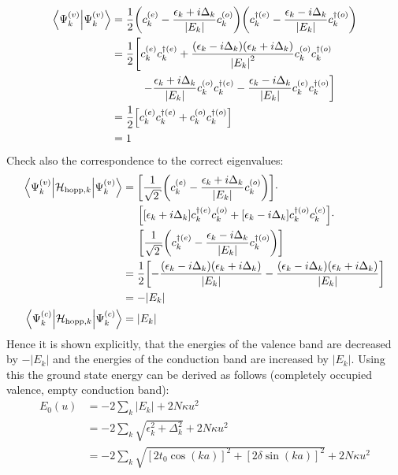 \begin{align}
\left\langle\Psi_k^{(v)}\Big|\Psi_k^{(v)}\right\rangle &= \frac{1}{2}
\left(c_k^{(e)}-\frac{\epsilon_k + i \Delta_k}{|E_k|}c_{k}^{(o)}\right)
\left(c_k^{\dagger(e)}-\frac{\epsilon_k - i \Delta_k}{|E_k|}c_{k}^{\dagger(o)}\right)\\
&= \frac{1}{2} \left[c_k^{(e)}c_k^{\dagger(e)}+\frac{\left(\epsilon_k-i\Delta_k\right)\left(\epsilon_k+i\Delta_k\right)}{\left|E_k\right|^2}c_k^{(o)}c_k^{\dagger(o)}\right.\nonumber\\
&\hspace*{1cm}\left.-\frac{\epsilon_k+i\Delta_k}{|E_k|}c_k^{(o)}c_k^{\dagger(e)}-\frac{\epsilon_k-i\Delta_k}{|E_k|}c_k^{(e)}c_k^{\dagger(o)}\right]\\
&= \frac{1}{2}\left[c_k^{(e)}c_k^{\dagger(e)}+c_k^{(o)}c_k^{\dagger(o)}\right]\\
&= 1
\end{align}
Check also the correspondence to the correct eigenvalues:
\begin{align}
	\left\langle\Psi_k^{(v)}\Big|\mathcal{H}_{\text{hopp},k}\Big|\Psi_k^{(v)}\right\rangle &=  \left[\frac{1}{\sqrt{2}}\left(c_k^{(e)}-\frac{\epsilon_k + i \Delta_k}{|E_k|}c_{k}^{(o)}\right)\right]\cdot\nonumber \\
	&\hspace*{.5cm}\left[
	\left[\epsilon_k + i\Delta_k\right]c_{k}^{\dagger(e)}c_{k}^{(o)} + \left[\epsilon_k-i\Delta_k \right]	c_{k}^{\dagger(o)}c_{k}^{(e)}
	\right]\cdot\nonumber\\
	&\hspace*{.5cm}\left[\frac{1}{\sqrt{2}}\left(c_k^{\dagger(e)}-\frac{\epsilon_k - i \Delta_k}{|E_k|}c_{k}^{\dagger(o)}\right)\right]\\
	&=  \frac{1}{2}\left[-\frac{(\epsilon_k-i\Delta_k)(\epsilon_k+i\Delta_k)}{|E_k|}-\frac{(\epsilon_k-i\Delta_k)(\epsilon_k+i\Delta_k)}{|E_k|}\right]\\
	&= - |E_k|\\
	\left\langle\Psi_k^{(c)}\Big|\mathcal{H}_{\text{hopp},k}\Big|\Psi_k^{(c)}\right\rangle &= |E_k|
\end{align}
Hence it is shown explicitly, that the energies of the valence band are decreased by $-|E_k|$ and the energies of the conduction band are increased by $|E_k|$. Using this the ground state energy can be derived as follows (completely occupied valence, empty conduction band):
\begin{align}
	E_0(u) &=-2\sum_k |E_k| + 2N\kappa u^2\\
	&= -2\sum_k \sqrt{\epsilon_k^2+\Delta_k^2} + 2N\kappa u^2\\
	&= -2\sum_k \sqrt{\left[2t_0\cos(ka)\right]^2+\left[2\delta\sin(ka)\right]^2} + 2N\kappa u^2\\
\end{align}
